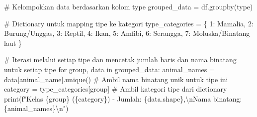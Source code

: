\documentclass[
  letterpaper,
]{krantz}
\makeatletter
\newenvironment{Shaded}{\begin{snugshade}}{\end{snugshade}}
\newcommand{\BuiltInTok}[1]{\textcolor[rgb]{0.00,0.23,0.31}{#1}}
\newcommand{\CharTok}[1]{\textcolor[rgb]{0.13,0.47,0.30}{#1}}
\newcommand{\CommentTok}[1]{\textcolor[rgb]{0.37,0.37,0.37}{#1}}
\newcommand{\ControlFlowTok}[1]{\textcolor[rgb]{0.00,0.23,0.31}{#1}}
\newcommand{\DecValTok}[1]{\textcolor[rgb]{0.68,0.00,0.00}{#1}}
\newcommand{\KeywordTok}[1]{\textcolor[rgb]{0.00,0.23,0.31}{#1}}
\newcommand{\NormalTok}[1]{\textcolor[rgb]{0.00,0.23,0.31}{#1}}
\newcommand{\OperatorTok}[1]{\textcolor[rgb]{0.37,0.37,0.37}{#1}}
\newcommand{\SpecialCharTok}[1]{\textcolor[rgb]{0.37,0.37,0.37}{#1}}
\newcommand{\SpecialStringTok}[1]{\textcolor[rgb]{0.13,0.47,0.30}{#1}}
\newcommand{\StringTok}[1]{\textcolor[rgb]{0.13,0.47,0.30}{#1}}
\newenvironment{kframe}{%
\medskip{}
\setlength{\fboxsep}{.8em}
 \def\at@end@of@kframe{}%
 \ifinner\ifhmode%
  \def\at@end@of@kframe{\end{minipage}}%
  \begin{minipage}{\columnwidth}%
 \fi\fi%
 \def\FrameCommand##1{\hskip\@totalleftmargin \hskip-\fboxsep
 \colorbox{shadecolor}{##1}\hskip-\fboxsep
     \hskip-\linewidth \hskip-\@totalleftmargin \hskip\columnwidth}%
 \MakeFramed {\advance\hsize-\width
   \@totalleftmargin\z@ \linewidth\hsize
   \@setminipage}}%
 {\par\unskip\endMakeFramed%
 \at@end@of@kframe}
\renewenvironment{Shaded}{\begin{kframe}}{\end{kframe}}
\makeatother
\begin{document}
\begin{Shaded}
\begin{Highlighting}[]
\CommentTok{\# Kelompokkan data berdasarkan kolom \textquotesingle{}type\textquotesingle{}}
\NormalTok{grouped\_data }\OperatorTok{=}\NormalTok{ df.groupby(}\StringTok{\textquotesingle{}type\textquotesingle{}}\NormalTok{)}

\CommentTok{\# Dictionary untuk mapping tipe ke kategori}
\NormalTok{type\_categories }\OperatorTok{=}\NormalTok{ \{}
    \DecValTok{1}\NormalTok{: }\StringTok{\textquotesingle{}Mamalia\textquotesingle{}}\NormalTok{,}
    \DecValTok{2}\NormalTok{: }\StringTok{\textquotesingle{}Burung/Unggas\textquotesingle{}}\NormalTok{,}
    \DecValTok{3}\NormalTok{: }\StringTok{\textquotesingle{}Reptil\textquotesingle{}}\NormalTok{,}
    \DecValTok{4}\NormalTok{: }\StringTok{\textquotesingle{}Ikan\textquotesingle{}}\NormalTok{,}
    \DecValTok{5}\NormalTok{: }\StringTok{\textquotesingle{}Amfibi\textquotesingle{}}\NormalTok{,}
    \DecValTok{6}\NormalTok{: }\StringTok{\textquotesingle{}Serangga\textquotesingle{}}\NormalTok{,}
    \DecValTok{7}\NormalTok{: }\StringTok{\textquotesingle{}Moluska/Binatang laut\textquotesingle{}}
\NormalTok{\}}

\CommentTok{\# Iterasi melalui setiap tipe dan mencetak jumlah baris dan nama binatang untuk setiap tipe}
\ControlFlowTok{for}\NormalTok{ group, data }\KeywordTok{in}\NormalTok{ grouped\_data:}
\NormalTok{    animal\_names }\OperatorTok{=}\NormalTok{ data[}\StringTok{\textquotesingle{}animal\_name\textquotesingle{}}\NormalTok{].unique()  }\CommentTok{\# Ambil nama binatang unik untuk tipe ini}
\NormalTok{    category }\OperatorTok{=}\NormalTok{ type\_categories[group]  }\CommentTok{\# Ambil kategori tipe dari dictionary}
    \BuiltInTok{print}\NormalTok{(}\SpecialStringTok{f"Kelas }\SpecialCharTok{\{}\NormalTok{group}\SpecialCharTok{\}}\SpecialStringTok{ (}\SpecialCharTok{\{}\NormalTok{category}\SpecialCharTok{\}}\SpecialStringTok{) {-} Jumlah: }\SpecialCharTok{\{}\NormalTok{data}\SpecialCharTok{.}\NormalTok{shape}\SpecialCharTok{\}}\SpecialStringTok{,}\CharTok{\textbackslash{}n}\SpecialStringTok{Nama binatang: }\SpecialCharTok{\{}\NormalTok{animal\_names}\SpecialCharTok{\}}\CharTok{\textbackslash{}n}\SpecialStringTok{"}\NormalTok{)}
\end{Highlighting}
\end{Shaded}
\end{document}
